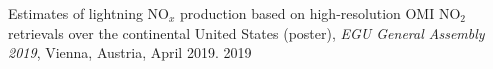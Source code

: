 \begin{cvhonors}
\publication
{Estimates of lightning NO$_x$ production based on high-resolution OMI NO$_2$ retrievals over the continental United States (poster),
\emph{EGU General Assembly 2019},
Vienna, Austria, April 2019.} %
{2019} %

\end{cvhonors}
